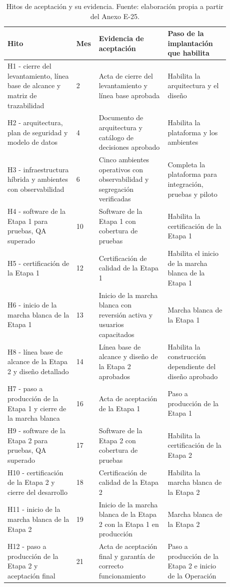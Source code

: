 \documentclass[11pt]{article}
\begin{document}
\begin{longtable}{@{}p{0.290\linewidth}p{0.048\linewidth}p{0.290\linewidth}p{0.251\linewidth}@{}}
\caption[Hitos de aceptación y su evidencia]{Hitos de aceptación y su evidencia. Fuente: elaboración propia a partir del Anexo E-25.}\label{tab:t18-6}\\
\toprule
\textbf{Hito} & \textbf{Mes} & \textbf{Evidencia de aceptación} & \textbf{Paso de la implantación que habilita} \\
\midrule
\endhead
\bottomrule
\endlastfoot
H1 - cierre del levantamiento, línea base de alcance y matriz de trazabilidad & 2 & Acta de cierre del levantamiento y línea base aprobada & Habilita la arquitectura y el diseño \\
H2 - arquitectura, plan de seguridad y modelo de datos & 4 & Documento de arquitectura y catálogo de decisiones aprobado & Habilita la plataforma y los ambientes \\
H3 - infraestructura híbrida y ambientes con observabilidad & 6 & Cinco ambientes operativos con observabilidad y segregación verificadas & Completa la plataforma para integración, pruebas y piloto \\
H4 - software de la Etapa 1 para pruebas, QA superado & 10 & Software de la Etapa 1 con cobertura de pruebas & Habilita la certificación de la Etapa 1 \\
H5 - certificación de la Etapa 1 & 12 & Certificación de calidad de la Etapa 1 & Habilita el inicio de la marcha blanca de la Etapa 1 \\
H6 - inicio de la marcha blanca de la Etapa 1 & 13 & Inicio de la marcha blanca con reversión activa y usuarios capacitados & Marcha blanca de la Etapa 1 \\
H8 - línea base de alcance de la Etapa 2 y diseño detallado & 14 & Línea base de alcance y diseño de la Etapa 2 aprobados & Habilita la construcción dependiente del diseño aprobado \\
H7 - paso a producción de la Etapa 1 y cierre de la marcha blanca & 16 & Acta de aceptación de la Etapa 1 & Paso a producción de la Etapa 1 \\
H9 - software de la Etapa 2 para pruebas, QA superado & 17 & Software de la Etapa 2 con cobertura de pruebas & Habilita la certificación de la Etapa 2 \\
H10 - certificación de la Etapa 2 y cierre del desarrollo & 18 & Certificación de calidad de la Etapa 2 & Habilita la marcha blanca de la Etapa 2 \\
H11 - inicio de la marcha blanca de la Etapa 2 & 19 & Inicio de la marcha blanca de la Etapa 2 con la Etapa 1 en producción & Marcha blanca de la Etapa 2 \\
H12 - paso a producción de la Etapa 2 y aceptación final & 21 & Acta de aceptación final y garantía de correcto funcionamiento & Paso a producción de la Etapa 2 e inicio de la Operación \\
\end{longtable}
\end{document}
